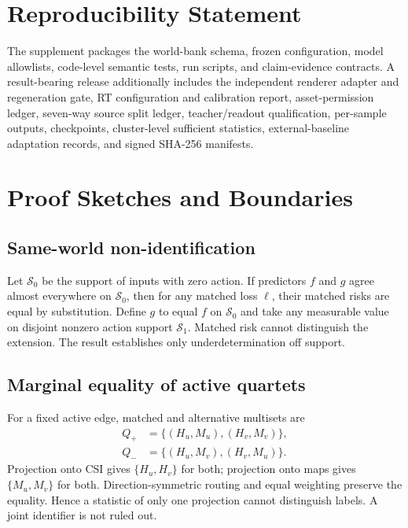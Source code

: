 \documentclass{article}
\newcommand{\csi}{H}
\newcommand{\map}{M}
\begin{document}
\section*{Reproducibility Statement}

The supplement packages the world-bank schema, frozen configuration, model
allowlists, code-level semantic tests, run scripts, and claim-evidence
contracts.  A result-bearing release additionally includes the independent renderer
adapter and regeneration gate, RT configuration and calibration report,
asset-permission ledger, seven-way source split ledger, teacher/readout
qualification, per-sample outputs, checkpoints, cluster-level sufficient
statistics, external-baseline adaptation records, and signed SHA-256 manifests.




\appendix

\section{Proof Sketches and Boundaries}

\subsection{Same-world non-identification}
Let $\mathcal S_0$ be the support of inputs with zero action.  If predictors
$f$ and $g$ agree almost everywhere on $\mathcal S_0$, then for any matched
loss $\ell$, their matched risks are equal by substitution.  Define $g$ to
equal $f$ on $\mathcal S_0$ and take any measurable value on disjoint nonzero
action support $\mathcal S_1$.  Matched risk cannot distinguish the extension.
The result establishes only underdetermination off support.

\subsection{Marginal equality of active quartets}
For a fixed active edge, matched and alternative multisets are
\begin{align*}
Q_+&=\{(\csi_u,\map_u),(\csi_v,\map_v)\},\\
Q_-&=\{(\csi_u,\map_v),(\csi_v,\map_u)\}.
\end{align*}
Projection onto CSI gives $\{\csi_u,\csi_v\}$ for both; projection onto maps
gives $\{\map_u,\map_v\}$ for both.  Direction-symmetric routing and equal
weighting preserve the equality.  Hence a statistic of only one projection
cannot distinguish labels.  A joint identifier is not ruled out.
\end{document}

